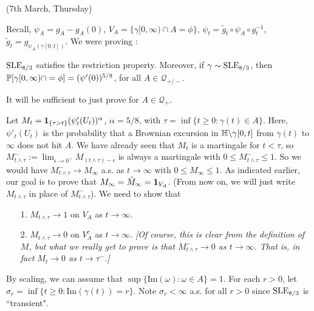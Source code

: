 \documentclass[12pt,a4paper]{article}
\newenvironment{proof}
{\begin{changemargin}{0.5cm}{0.5cm} 
	}%
	{\end{changemargin}
}
\newenvironment{p}
{\begin{proof} 
	}%
	{\end{proof}
}
\begin{document}
\newday

(7th March, Thursday)
\s

Recall, $\psi_A = g_A-g_A(0)$, $V_A =\{\gamma [0, \infty) \cap A =\phi\}$, $\psi_t = \tilde{g}_t \circ \psi_A \circ g_t^{-1}$, $\tilde{g}_t = g_{\psi_{A}(\gamma[0, t])}$. We were proving :
\s

\thm $\text{SLE}_{8/3}$ satisfies the restriction property. Moreover, if $\gamma \sim \text{SLE}_{8/3}$, then $\mathbb{P}[\gamma [0, \infty) \cap = \phi ] = (\psi'(0))^{5/8}$, for all $A\in \mathscr{Q}_{+/-}$. 
\begin{p}
\pf It will be sufficient to just prove for $A \in \mathscr{Q}_+$.

\quad Let $M_t = \bm{1}_{\{\tau >t\}}(\psi'_t(U_t))^{\alpha}$, $\alpha = 5/8$, with $\tau = \inf \{t\geq 0: \gamma(t) \in A\}$. Here, $\psi'_t(U_t)$ is the probability that a Brownian excursion in $\mathbb{H} \backslash \gamma[0,t]$ from $\gamma(t)$ to $\infty$ does not hit $A$. We have already seen that $M_{t}$ is a martingale for $t< \tau$, so $M^-_{t\wedge \tau} := \lim_{\epsilon \rightarrow 0^+} M_{(t\wedge \tau)-\epsilon}$ is always a martingale with $0\leq M^-_{t\wedge \tau} \leq 1$. So we would have $M^-_{t \wedge \tau} \rightarrow M_{\infty}$ a.s. as $t\rightarrow \infty$ with $0\leq M_{\infty} \leq 1$. As indicated earlier, our goal is to prove that $M_{\infty} = \tilde{M}_{\infty} = \bm{1}_{V_A}$. (From now on, we will just write $M_{t\wedge \tau}$ in place of $M^-_{t \wedge \tau}$). We need to show that
\begin{itemize}
\item[1.] $M_{t\wedge \tau} \rightarrow 1$ on $V_A$ as $t\rightarrow \infty$.
\item[2.] $M_{t\wedge \tau} \rightarrow 0$ on $V_A^c$ as $t\rightarrow \infty$. \emph{[Of course, this is clear from the definition of $M$, but what we really get to prove is that $M^-_{t \wedge \tau} \rightarrow 0$ as $t\rightarrow \infty$. That is, in fact $M_{t} \rightarrow 0$ as $t\rightarrow \tau^-$.]}
\end{itemize}
By scaling, we can assume that $\sup \{\text{Im}(\omega) : \omega \in A \} =1$. For each $r>0$, let $\sigma_r =\inf \{t\geq 0 : \text{Im}(\gamma(t))=r\}$. Note $\sigma_r < \infty$ a.s. for all $r>0$ since $\text{SLE}_{8/3}$ is ``transient".


\end{p}
\end{document}
